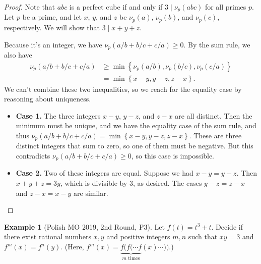 \documentclass[11pt]{article}
\theoremstyle{definition}
\newtheorem{example}{Example}
\begin{document}
\begin{proof}
Note that $abc$ is a perfect cube if and only if $3 \mid \nu_p(abc)$ for all primes $p$. Let $p$ be a prime, and let $x$, $y$, and $z$ be $\nu_p(a)$, $\nu_p(b)$, and $\nu_p(c)$, respectively. We will show that $3 \mid x + y + z$.

Because it's an integer, we have $\nu_p(a/b + b/c + c/a) \ge 0$. By the sum rule, we also have
\begin{align*}
  \nu_p(a/b + b/c + c/a)
  &\ge \min\left\{ \nu_p(a/b), \nu_p(b/c), \nu_p(c/a) \right\} \\
  &= \min\left\{ x-y, y-z, z-x \right\}.
\end{align*}
We can't combine these two inequalities, so we reach for the equality case by reasoning about uniqueness.

\begin{itemize}
\item \textbf{Case 1.} The three integers $x-y$, $y-z$, and $z-x$ are all distinct. Then the minimum must be unique, and we have the equality case of the sum rule, and thus $\nu_p(a/b + b/c + c/a) = \min\left\{ x-y, y-z, z-x \right\}$. These are three distinct integers that sum to zero, so one of them must be negative. But this contradicts $\nu_p(a/b + b/c + c/a) \ge 0$, so this case is impossible.

\item \textbf{Case 2.} Two of these integers are equal. Suppose we had $x - y = y -z$. Then $x + y + z = 3y$, which is divisible by $3$, as desired. The cases $y - z = z - x$ and $z - x = x - y$ are similar.
\end{itemize}
\end{proof}

\begin{example}[Polish MO 2019, 2nd Round, P3]
Let $f(t)=t^3+t$. Decide if there exist rational numbers $x, y$ and positive integers $m, n$ such that $xy = 3$ and $f^m(x) = f^n(y)$. (Here, $f^m(x) = \underbrace{f(f(\cdots f}_{m \text{ times}}(x) \cdots))$.)
\end{example}
\end{document}
